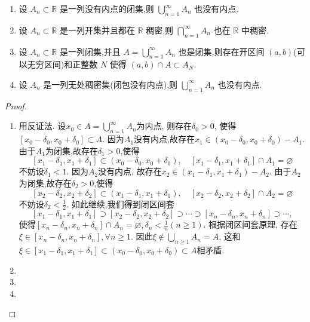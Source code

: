 \documentclass[../../main.tex]{subfiles}%
\begin{document}
\begin{theorem}[Baire纲定理]\label{theorem:Baire纲定理}
\begin{enumerate}
\item 设 \( A_n \subset \mathbb{R}\) 是一列没有内点的闭集,则 \(\bigcup_{n=1}^{\infty}{A_n} \)
也没有内点.

\item 设 \( A_n \subset \mathbb{R}\) 是一列开集并且都在 \(\mathbb{R}\) 稠密,则 \(\bigcap_{n=1}^{\infty}A_n \)
也在 \(\mathbb{R}\) 中稠密.

\item 设 \( A_n \subset \mathbb{R}\) 是一列闭集,并且 $A=\bigcup_{n=1}^{\infty}{A_n}$
也是闭集,则存在开区间 \((a, b)\)(可以无穷区间)和正整数 \( N \) 使得 \((a,b) \cap A \subset A_N\).

\item 设 \( A_n \) 是一列无处稠密集(闭包没有内点),则 \(\bigcup_{n=1}^{\infty} A_n \)
也没有内点.
\end{enumerate}
\end{theorem}
\begin{proof}
\begin{enumerate}
\item 用反证法. 设\(x_0\in A=\bigcup_{n=1}^{\infty} A_n\)为内点, 则存在\(\delta_0 > 0\), 使得\([x_0 - \delta_0,x_0 + \delta_0]\subset A\).
因为\(A_1\)没有内点,故存在\(x_1\in(x_0 - \delta_0,x_0 + \delta_0)-A_1\).由于\(A_1\)为闭集,故存在\(\delta_1 > 0\),使得
\[
[x_1 - \delta_1,x_1 + \delta_1]\subset(x_0 - \delta_0,x_0 + \delta_0),\quad [x_1 - \delta_1,x_1 + \delta_1]\cap A_1=\varnothing
\]
不妨设\(\delta_1 < 1\). 因为\(A_2\)没有内点, 故存在\(x_2\in(x_1 - \delta_1,x_1 + \delta_1)-A_2\). 由于\(A_2\)为闭集,故存在\(\delta_2 > 0\),使得
\[
[x_2 - \delta_2,x_2 + \delta_2]\subset(x_1 - \delta_1,x_1 + \delta_1),\quad [x_2 - \delta_2,x_2 + \delta_2]\cap A_2=\varnothing
\]
不妨设\(\delta_2 < \frac{1}{2}\). 如此继续,我们得到闭区间套
\[
[x_1 - \delta_1,x_1 + \delta_1]\supset[x_2 - \delta_2,x_2 + \delta_2]\supset\cdots\supset[x_n - \delta_n,x_n + \delta_n]\supset\cdots,
\]
使得\([x_n - \delta_n,x_n + \delta_n]\cap A_n=\varnothing,\delta_n < \frac{1}{n}(n\geqslant1)\).
根据闭区间套原理, 存在\(\xi\in[x_n - \delta_n,x_n + \delta_n],\forall n\geqslant1\). 因此\(\xi\notin\bigcup_{n\geqslant1}A_n = A\),
这和\(\xi\in[x_1 - \delta_1,x_1 + \delta_1]\subset(x_0 - \delta_0,x_0 + \delta_0)\subset A\)相矛盾.

\item 

\item 

\item 
\end{enumerate}

\end{proof}
\end{document}
